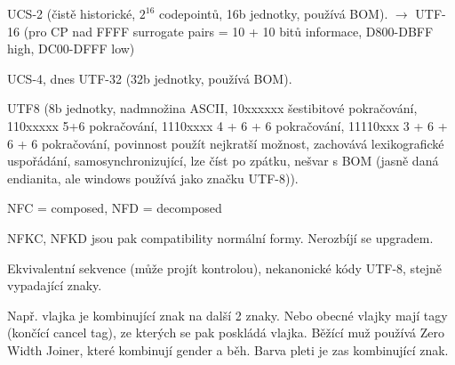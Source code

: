 \documentclass[12pt]{article}					%
\begin{document}
    \begin{definice}[Reprezentace]
        UCS-2 (čistě historické, $2^{16}$ codepointů, 16b jednotky, používá BOM). $\longrightarrow$ UTF-16 (pro CP nad FFFF surrogate pairs = 10 + 10 bitů informace, D800-DBFF high, DC00-DFFF low)

        UCS-4, dnes UTF-32 (32b jednotky, používá BOM).

        UTF8 (8b jednotky, nadmnožina ASCII, 10xxxxxx šestibitové pokračování, 110xxxxx 5+6 pokračování, 1110xxxx 4 + 6 + 6 pokračování, 11110xxx 3 + 6 + 6 + 6 pokračování, povinnost použít nejkratší možnost, zachovává lexikografické uspořádání, samosynchronizující, lze číst po zpátku, nešvar s BOM (jasně daná endianita, ale windows používá jako značku UTF-8)).
    \end{definice}

    \begin{definice}
        NFC = composed, NFD = decomposed

        NFKC, NFKD jsou pak compatibility normální formy. Nerozbíjí se upgradem.
    \end{definice}

    \begin{upozorneni}
        Ekvivalentní sekvence (může projít kontrolou), nekanonické kódy UTF-8, stejně vypadající znaky.
    \end{upozorneni}

    \begin{definice}
        Např. vlajka je kombinující znak na další 2 znaky. Nebo obecné vlajky mají tagy (končící cancel tag), ze kterých se pak poskládá vlajka. Běžící muž používá Zero Width Joiner, které kombinují gender a běh. Barva pleti je zas kombinující znak.
    \end{definice}

\end{document}
